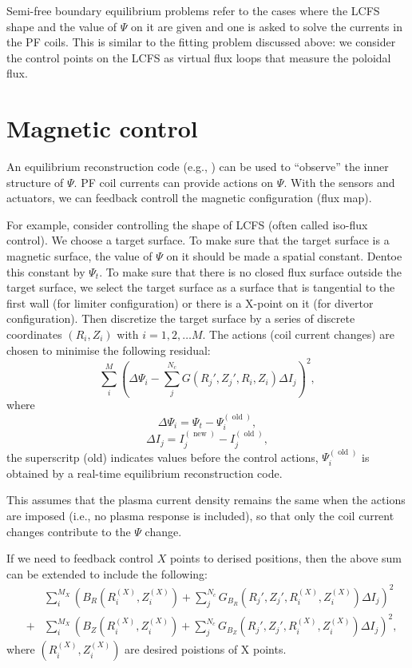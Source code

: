 \documentclass{llncs}
\newcommand{\tmop}[1]{\ensuremath{\operatorname{#1}}}
\newcommand{\tmtexttt}[1]{\text{{\ttfamily{#1}}}}
\begin{document}
Semi-free boundary equilibrium problems refer to the cases where the LCFS
shape and the value of $\Psi$ on it are given and one is asked to solve the
currents in the PF coils. This is similar to the fitting problem discussed
above: we consider the control points on the LCFS as virtual flux loops that
measure the poloidal flux.

\section{Magnetic control}

An equilibrium reconstruction code (e.g., \tmtexttt{rtefit}) can be used to
``observe'' the inner structure of $\Psi$. PF coil currents can provide
actions on $\Psi$. With the sensors and actuators, we can feedback controll
the magnetic configuration (flux map).

For example, consider controlling the shape of LCFS (often called iso-flux
control). We choose a target surface. To make sure that the target surface is
a magnetic surface, the value of $\Psi$ on it should be made a spatial
constant. Dentoe this constant by $\Psi_t$. To make sure that there is no
closed flux surface outside the target surface, we select the target surface
as a surface that is tangential to the first wall (for limiter configuration)
or there is a X-point on it (for divertor configuration). Then discretize the
target surface by a series of discrete coordinates $(R_i, Z_i)$ with $i = 1,
2, \ldots M$. The actions (coil current changes) are chosen to minimise the
following residual:
\begin{equation}
  \sum_i^M \left( \Delta \Psi_i - \sum_j^{N_c} G (R_j', Z_j', R_i, Z_i) \Delta
  I_j \right)^2,
\end{equation}
where
\begin{equation}
  \Delta \Psi_i = \Psi_t - \Psi_i^{(\tmop{old})},
\end{equation}
\begin{equation}
  \Delta I_j = I_j^{(\tmop{new})} - I_j^{(\tmop{old})},
\end{equation}
the superscritp (old) indicates values before the control actions,
$\Psi_i^{(\tmop{old})}$ is obtained by a real-time equilibrium reconstruction
code.

This assumes that the plasma current density remains the same when the actions
are imposed (i.e., no plasma response is included), so that only the coil
current changes contribute to the $\Psi$ change.

If we need to feedback control $X$ points to derised positions, then the above
sum can be extended to include the following:
\begin{eqnarray}
  &  & \sum_i^{M_X} \left( B_R (R_i^{(X)}, Z_i^{(X)}) + \sum_j^{N_c} G_{B_R}
  (R_j', Z_j', R_i^{(X)}, Z_i^{(X)}) \Delta I_j \right)^2 \nonumber\\
  & + & \sum_i^{M_X} \left( B_Z (R_i^{(X)}, Z_i^{(X)}) + \sum_j^{N_c} G_{B_Z}
  (R_j', Z_j', R_i^{(X)}, Z_i^{(X)}) \Delta I_j \right)^2, 
\end{eqnarray}
where $(R_i^{(X)}, Z_i^{(X)})$ are desired poistions of X points.
\end{document}
